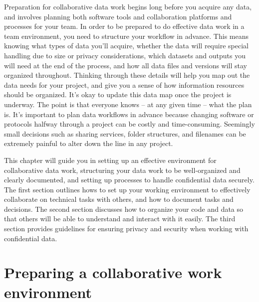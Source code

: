 
\begin{fullwidth}
Preparation for collaborative data work begins long before you acquire any data,
and involves planning both software tools and collaboration platforms and processes for your team.
In order to be prepared to do effective data work in a team environment,
you need to structure your workflow in advance.
This means knowing what types of data you'll acquire, 
whether the data will require special handling due to size or privacy considerations,
which datasets and outputs you will need at the end of the process,
and how all data files and versions will stay organized throughout.
Thinking through these details will help you map out the data needs for your project,
and give you a sense of how information resources should be organized.
It's okay to update this data map once the project is underway.
The point is that everyone knows -- at any given time -- what the plan is.
It's important to plan data workflows in advance because 
changing software or protocols halfway through a project can be costly and time-consuming.
Seemingly small decisions such as sharing services, folder structures,
and filenames can be extremely painful to alter down the line in any project.

This chapter will guide you in setting up an effective environment for collaborative data work, 
structuring your data work to be well-organized and clearly documented,
and setting up processes to handle confidential data securely.
The first section outlines hows to set up your working environment
to effectively collaborate on technical tasks with others,
and how to document tasks and decisions.
The second section discusses how to organize your code and data so that others
will be able to understand and interact with it easily.
The third section provides guidelines for ensuring 
privacy and security when working with confidential data. 

\end{fullwidth}


\section{Preparing a collaborative work environment}

